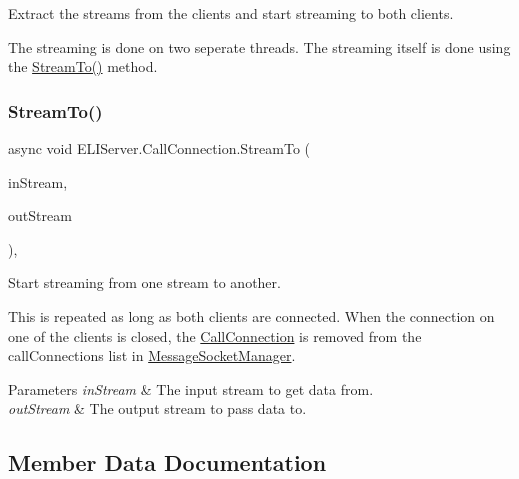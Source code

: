 Extract the streams from the clients and start streaming to both clients.

The streaming is done on two seperate threads. The streaming itself is done using the \hyperlink{class_e_l_i_server_1_1_call_connection_a01514395594e70da5e9acb48d908a238}{Stream\+To()} method. \mbox{\label{class_e_l_i_server_1_1_call_connection_a01514395594e70da5e9acb48d908a238}} 
\subsubsection{\texorpdfstring{Stream\+To()}{StreamTo()}}
{\footnotesize\ttfamily async void E\+L\+I\+Server.\+Call\+Connection.\+Stream\+To (\begin{DoxyParamCaption}\item[{Network\+Stream}]{in\+Stream,  }\item[{Network\+Stream}]{out\+Stream }\end{DoxyParamCaption})\hspace{0.3cm}{\ttfamily [inline]}, {\ttfamily [private]}}





Start streaming from one stream to another.

This is repeated as long as both clients are connected. When the connection on one of the clients is closed, the \hyperlink{class_e_l_i_server_1_1_call_connection}{Call\+Connection} is removed from the call\+Connections list in \hyperlink{class_e_l_i_server_1_1_message_socket_manager}{Message\+Socket\+Manager}. 


\begin{DoxyParams}{Parameters}
{\em in\+Stream} & The input stream to get data from.\\
\hline
{\em out\+Stream} & The output stream to pass data to.\\
\hline
\end{DoxyParams}


\subsection{Member Data Documentation}
\mbox{\label{class_e_l_i_server_1_1_call_connection_adfdb5fc52756028eeac454f6e61e9de6}} 
